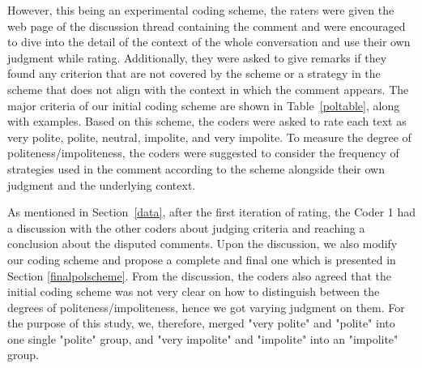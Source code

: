 However, this being an experimental coding scheme, 
the raters were given the web page 
of the discussion thread containing the comment 
and were encouraged to dive 
into the detail of the context of the whole conversation 
and use their own judgment while rating. 
Additionally, they were asked to give remarks 
if they found any criterion 
that are not covered by the scheme 
or a strategy in the scheme that
does not align with the context in which the comment appears. 
The major criteria of our initial coding scheme 
are shown in Table~\ref{poltable}, along with examples.
Based on this scheme, 
the coders were asked to rate each text as 
very polite, polite, neutral, impolite, and very impolite.
To measure the degree of politeness/impoliteness, 
the coders were suggested to consider 
the frequency of strategies used in the comment 
according to the scheme 
alongside their own judgment and the underlying context.

As mentioned in Section~\ref{data}, 
after the first iteration of rating, 
the Coder 1 had a discussion with the other coders 
about judging criteria 
and reaching a conclusion about the disputed comments. 
Upon the discussion, 
we also modify our coding scheme and 
propose a complete and final one 
which is presented in Section \ref{finalpolscheme}. 
From the discussion, 
the coders also agreed that the initial coding scheme 
was not very clear on how to distinguish 
between the degrees of politeness/impoliteness, 
hence we got varying judgment on them. 
For the purpose of this study, 
we, therefore, merged 
"very polite" and "polite" into one single "polite" group,  
and "very impolite" and "impolite" into an "impolite" group.

